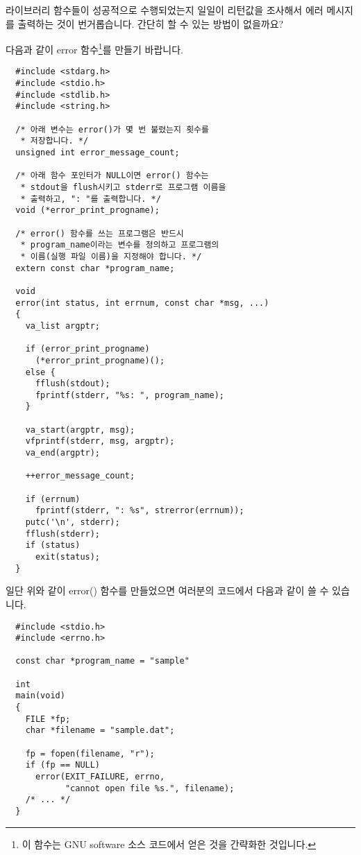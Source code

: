 \begin{faq}	\label{faq:error}
	라이브러리 함수들이 성공적으로 수행되었는지 일일이 리턴값을 조사해서
	에러 메시지를 출력하는 것이 번거롭습니다. 간단히 할 수 있는 방법이
	없을까요?

\A
	다음과 같이 error 함수\footnote{이  함수는 GNU software
	소스 코드에서 얻은 것을 간략화한 것입니다.}를 만들기 바랍니다.

\begin{verbatim}
  #include <stdarg.h>
  #include <stdio.h>
  #include <stdlib.h>
  #include <string.h>

  /* 아래 변수는 error()가 몇 번 불렸는지 횟수를 
   * 저장합니다. */
  unsigned int error_message_count;

  /* 아래 함수 포인터가 NULL이면 error() 함수는 
   * stdout을 flush시키고 stderr로 프로그램 이름을
   * 출력하고, ": "를 출력합니다. */
  void (*error_print_progname);
    
  /* error() 함수를 쓰는 프로그램은 반드시
   * program_name이라는 변수를 정의하고 프로그램의
   * 이름(실행 파일 이름)을 지정해야 합니다. */
  extern const char *program_name;

  void
  error(int status, int errnum, const char *msg, ...)
  {
    va_list argptr;
    
    if (error_print_progname)
      (*error_print_progname)();
    else {
      fflush(stdout);
      fprintf(stderr, "%s: ", program_name);
    }
    
    va_start(argptr, msg);
    vfprintf(stderr, msg, argptr);
    va_end(argptr);
    
    ++error_message_count;
     
    if (errnum)
      fprintf(stderr, ": %s", strerror(errnum));
    putc('\n', stderr);
    fflush(stderr);
    if (status)
      exit(status);
  }
\end{verbatim}

	\noindent 일단 위와 같이 error() 함수를 만들었으면 여러분의
	코드에서 다음과 같이 쓸 수 있습니다.

\begin{verbatim}
  #include <stdio.h>
  #include <errno.h>

  const char *program_name = "sample"

  int
  main(void)
  {
    FILE *fp;
    char *filename = "sample.dat";

    fp = fopen(filename, "r");
    if (fp == NULL)
      error(EXIT_FAILURE, errno, 
            "cannot open file %s.", filename);
    /* ... */
  }
\end{verbatim}


\end{faq}
